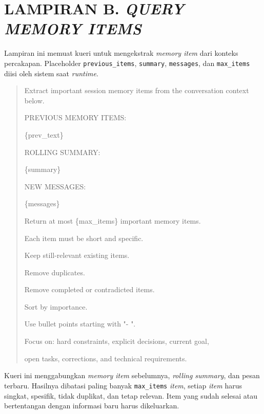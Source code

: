 \clearpage
\chapter*{LAMPIRAN B. \emph{QUERY MEMORY ITEMS}}

Lampiran ini memuat kueri untuk mengekstrak \emph{memory item} dari konteks
percakapan. Placeholder \texttt{previous\_items}, \texttt{summary},
\texttt{messages}, dan \texttt{max\_items} diisi oleh sistem saat \emph{runtime}.

\begin{quote}\small\ttfamily\raggedright
Extract important session memory items from the conversation context below.\par
\par
PREVIOUS MEMORY ITEMS:\par
\{prev\_text\}\par
\par
ROLLING SUMMARY:\par
\{summary\}\par
\par
NEW MESSAGES:\par
\{messages\}\par
\par
Return at most \{max\_items\} important memory items.\par
Each item must be short and specific.\par
Keep still-relevant existing items.\par
Remove duplicates.\par
Remove completed or contradicted items.\par
Sort by importance.\par
Use bullet points starting with "- ".\par
Focus on: hard constraints, explicit decisions, current goal,\par
open tasks, corrections, and technical requirements.
\end{quote}

Kueri ini menggabungkan \emph{memory item} sebelumnya, \emph{rolling summary}, dan pesan
terbaru. Hasilnya dibatasi paling banyak \texttt{max\_items} \emph{item}, setiap \emph{item}
harus singkat, spesifik, tidak duplikat, dan tetap relevan. Item yang sudah
selesai atau bertentangan dengan informasi baru harus dikeluarkan.
